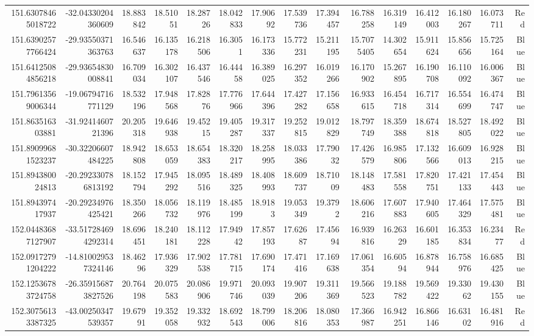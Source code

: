 \begin{center}
\begin{longtable}{rrrrrrrrrrrrrrr}
151.63078465018722 & -32.04330204360609 & 18.883842 & 18.51051 & 18.28726 & 18.042833 & 17.90692 & 17.539736 & 17.394457 & 16.788258 & 16.319149 & 16.412003 & 16.180267 & 16.073711 & Red \\
151.63902577766424 & -29.93550371363763 & 16.546637 & 16.135178 & 16.218506 & 16.3051 & 16.173336 & 15.772231 & 15.211195 & 15.7075405 & 14.302654 & 15.911624 & 15.856656 & 15.725164 & Blue \\
151.64125084856218 & -29.93654830008841 & 16.709034 & 16.302107 & 16.437546 & 16.44458 & 16.389025 & 16.297352 & 16.019266 & 16.170902 & 15.267895 & 16.190708 & 16.110092 & 16.006367 & Blue \\
151.79613569006344 & -19.06794716771129 & 18.532196 & 17.948568 & 17.82876 & 17.776966 & 17.644396 & 17.427282 & 17.156658 & 16.933615 & 16.454718 & 16.717314 & 16.554699 & 16.474747 & Blue \\
151.863516303881 & -31.9241460721396 & 20.205318 & 19.646938 & 19.45215 & 19.405287 & 19.317337 & 19.252815 & 19.012829 & 18.797749 & 18.359388 & 18.674818 & 18.527805 & 18.492022 & Blue \\
151.89099681523237 & -30.32206607484225 & 18.942808 & 18.653059 & 18.654383 & 18.320217 & 18.258995 & 18.033386 & 17.79032 & 17.426579 & 16.985806 & 17.132566 & 16.609013 & 16.928215 & Blue \\
151.894380024813 & -20.292330786813192 & 18.152794 & 17.945292 & 18.095516 & 18.489325 & 18.408993 & 18.609737 & 18.71009 & 18.148483 & 17.581558 & 17.820751 & 17.421133 & 17.454443 & Blue \\
151.894397417937 & -20.29234976425421 & 18.350266 & 18.056732 & 18.119976 & 18.485199 & 18.9183 & 19.053349 & 19.3792 & 18.606216 & 17.607883 & 17.940605 & 17.464329 & 17.575481 & Blue \\
152.04483687127907 & -33.517284694292314 & 18.696451 & 18.240181 & 18.112228 & 17.94942 & 17.857193 & 17.62687 & 17.45694 & 16.939816 & 16.26329 & 16.601185 & 16.353834 & 16.23477 & Red \\
152.09172791204222 & -14.810029537324146 & 18.46296 & 17.936329 & 17.902538 & 17.781715 & 17.690174 & 17.471416 & 17.169638 & 17.061354 & 16.60594 & 16.878944 & 16.758976 & 16.685425 & Blue \\
152.12536783724758 & -26.359156873827526 & 20.764198 & 20.075583 & 20.086906 & 19.971746 & 20.093039 & 19.907206 & 19.311369 & 19.566523 & 19.188782 & 19.569422 & 19.33062 & 19.430155 & Blue \\
152.30756133387325 & -43.00250347539357 & 19.67991 & 19.352058 & 19.332932 & 18.692543 & 18.799006 & 18.206816 & 18.080353 & 17.366987 & 16.942251 & 16.866146 & 16.63102 & 16.481916 & Red \\

\end{longtable}
\end{center}
